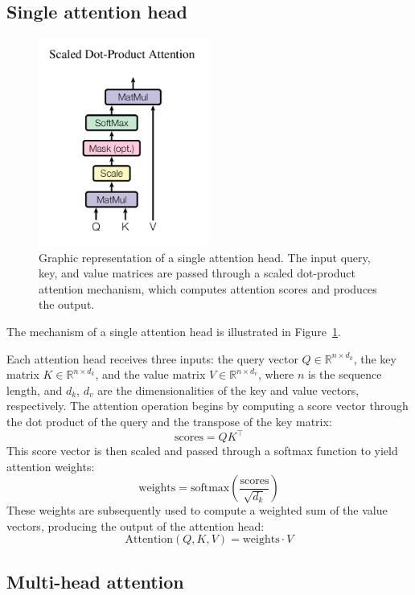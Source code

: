 \documentclass{pracalicmgr}
\begin{document}
\subsection{Single attention head}

\begin{figure}[h]
    \centering
    \includegraphics[width=0.5\textwidth]{src/scaledDotProd.png}
    \caption{Graphic representation of a single attention head. The input query, key, and value matrices are passed through a scaled dot-product attention mechanism, which computes attention scores and produces the output.}
    \label{fig:singleAttentionHead}
\end{figure}

The mechanism of a single attention head is illustrated in Figure~\ref{fig:singleAttentionHead}.


Each attention head receives three inputs: the query vector \( Q \in \mathbb{R}^{n \times d_k} \), the key matrix \( K \in \mathbb{R}^{n \times d_k} \), and the value matrix \( V \in \mathbb{R}^{n \times d_v} \), where \( n \) is the sequence length, and \( d_k \), \( d_v \) are the dimensionalities of the key and value vectors, respectively. The attention operation begins by computing a score vector through the dot product of the query and the transpose of the key matrix:
\[
\text{scores} = QK^\top
\]
This score vector is then scaled and passed through a softmax function to yield attention weights:
\[
\text{weights} = \text{softmax}\left(\frac{\text{scores}}{\sqrt{d_k}}\right)
\]
These weights are subsequently used to compute a weighted sum of the value vectors, producing the output of the attention head:
\[
\text{Attention}(Q, K, V) = \text{weights} \cdot V
\]

\subsection{Multi-head attention}
\end{document}
